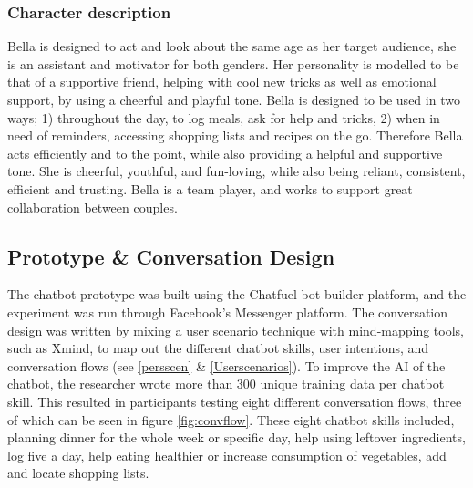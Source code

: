     \subsubsection{Character description}
    Bella is designed to act and look about the same age as her target audience, she is an assistant and motivator for both genders. Her personality is modelled to be that of a supportive friend, helping with cool new tricks as well as emotional support, by using a cheerful and playful tone. Bella is designed to be used in two ways; 1) throughout the day, to log meals, ask for help and tricks, 2) when in need of reminders, accessing shopping lists and recipes on the go. Therefore Bella acts efficiently and to the point, while also providing a helpful and supportive tone. She is cheerful, youthful, and fun-loving, while also being reliant, consistent, efficient and trusting. Bella is a team player, and works to support great collaboration between couples. 

\vspace{5mm}

    \subsection{Prototype \& Conversation Design}
    The chatbot prototype was built using the Chatfuel bot builder platform, and the experiment was run through Facebook's Messenger platform. The conversation design was written by mixing a user scenario technique with mind-mapping tools, such as Xmind, to map out the different chatbot skills, user intentions, and conversation flows (see \ref{persscen} \& \ref{Userscenarios}). To improve the AI of the chatbot, the researcher wrote more than 300 unique training data per chatbot skill. This resulted in participants testing eight different conversation flows, three of which can be seen in figure \ref{fig:convflow}. These eight chatbot skills included, planning dinner for the whole week or specific day, help using leftover ingredients, log five a day, help eating healthier or increase consumption of vegetables, add and locate shopping lists.
    
